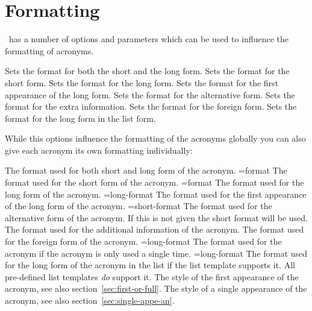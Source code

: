 \documentclass{acro-manual}
\begin{document}
\section{Formatting}\label{sec:formatting}
\acro\ has a number of options and parameters which can be used to influence
the formatting of acronyms.
\begin{options}
  \Default
    Sets the format for both the short and the long form.
  \Default
    Sets the format for the short form.
  \Default
    Sets the format for the long form.
  \Default
    Sets the format for the first appearance of the long form.
  \Default
    Sets the format for the alternative form.
  \Default
    Sets the format for the extra information.
  \Default
    Sets the format for the foreign form.
  \Default
    Sets the format for the long form in the list form.
\end{options}
While this options influence the formatting of the acronyms globally you can
also give each acronym its own formatting individually:
\begin{properties}
  \Default
    The format used for both short and long form of the acronym.
  \Default={format}
    The format used for the short form of the acronym.
  \Default={format}
    The format used for the long form of the acronym.
  \Default={long-format}
    The format used for the first appearance of the long form of the acronym.
  \Default={short-format}
    The format used for the alternative form of the acronym. If this is not
    given the short format will be used.
  \Default
    The format used for the additional information of the acronym.
  \Default
    The format used for the foreign form of the acronym.
  \Default={long-format}
    The format used for the acronym if the acronym is only used a single
    time.
  \Default={long-format}
    The format used for the long form of the acronym in the list if the list
    template supports it. All pre-defined list templates \emph{do} support
    it.
  \Default
    The style of the first appearance of the acronym, see also
    section~\vref{sec:first-or-full}.
  \Default
    The style of a single appearance of the acronym, see also
    section~\vref{sec:single-appe-an}.
\end{properties}
\end{document}

